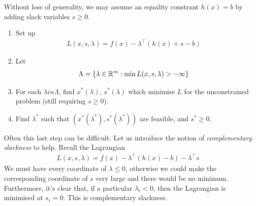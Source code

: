 \documentclass{../../template/note}
\begin{document}
    \begin{algorithm}
        Without loss of generality, we may assume an equality constrant $h(x) = b$ by adding slack variables $s \geq 0$.
        \begin{enumerate}[label=\protect\circled{\arabic*}]
            \item Set up
            \begin{align*}
                L(x, s, \lambda) = f(x) - \lambda^\intercal (h(x)+s-b)
            \end{align*}
            \item Let
            \begin{align*}
                \Lambda = \{\lambda \in \mathbb R^m: \min L(x, s, \lambda) > -\infty\}
            \end{align*}
            \item For each $\lambda in \Lambda$, find $x^*(\lambda)$, $s^*(\lambda)$ which minimise $L$ for the unconstrained problem (still requiring $s \geq 0$).
            \item Find $\lambda^*$ such that $(x^*(\lambda^*), s^*(\lambda^*))$ are feasible, and $s^* \geq 0$.           
        \end{enumerate}      
    \end{algorithm}
    
    Often this last step can be difficult. Let us introduce the notion of \emph{complementary slackness} to help. Recall the Lagrangian
    \begin{align*}
        L(x, s, \lambda) = f(x) - \lambda^\intercal(h(x)-b) - \lambda^\intercal s
    \end{align*}
    We must have every coordinate of $\lambda \leq 0$, otherwise we could make the corresponding coordinate of $s$ very large and there would be no minimum. Furthermore, it's clear that, if a particular $\lambda_i < 0$, then the Lagrangian is minimised at $s_i=0$. This is complementary slackness.
    
\end{document}
